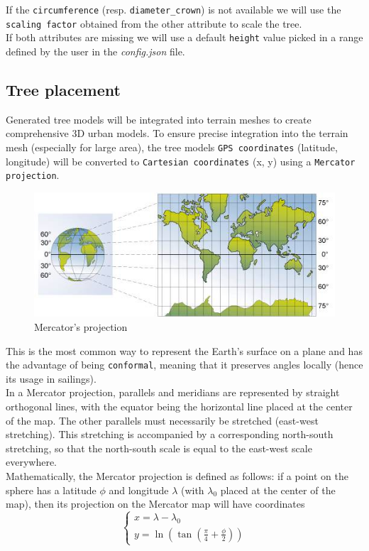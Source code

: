\documentclass[12pt]{article}
\begin{document}
If the \texttt{circumference} (resp. \texttt{diameter\_crown}) is not available
we will use the \texttt{scaling factor} obtained from the other attribute to 
scale the tree.\\
If both attributes are missing we will use a default \texttt{height} value 
picked in a range defined by the user in the \textit{config.json} file.

\subsection{Tree placement}

Generated tree models will be integrated into terrain meshes to create comprehensive
3D urban models. To ensure precise integration into the terrain mesh (especially for large area),
 the tree models \texttt{GPS coordinates} (latitude, longitude) will be converted
  to \texttt{Cartesian coordinates} (x, y) using a \texttt{Mercator projection}\cite{mercator-proj}.

\begin{figure}[H]
    \centering
    \includegraphics[width=1\textwidth]{images/mercator.jpg}
    \caption{Mercator's projection\cite{img:mercator}}
\end{figure}

This is the most common way to represent the Earth's surface on a plane and has
the advantage of being \texttt{conformal}, meaning that it preserves angles locally (hence
 its usage in sailings). \\
 In a Mercator projection, parallels and meridians are represented by straight
 orthogonal lines, with the equator being the horizontal line placed at the center
  of the map. The other parallels must necessarily be stretched (east-west
  stretching). This stretching is accompanied by a corresponding north-south
  stretching, so that the north-south scale is equal to the east-west scale
  everywhere. \\
  Mathematically, the Mercator projection is defined as follows: if a point on
  the sphere has a latitude $\phi$ and longitude $\lambda$ (with $\lambda_{0}$
  placed at the center of the map), then its projection on the Mercator map will
  have coordinates
  \begin{equation}
    \left\{
    \begin{array}{l}
        x =  \lambda - \lambda_{0} \\
        y =  \ln(\tan(\frac{\pi}{4} + \frac{\phi}{2}))
    \end{array}
    \right.
\end{equation}
\end{document}
